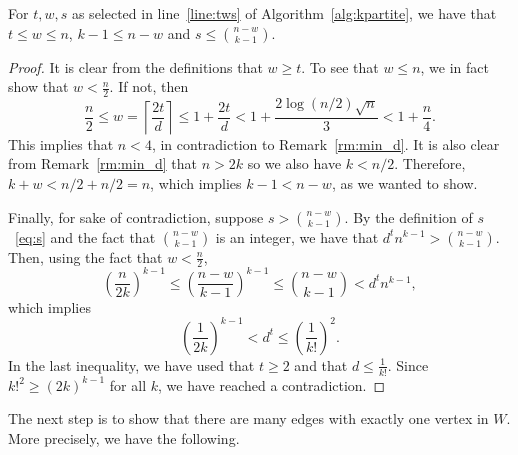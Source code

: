 \begin{lemma}\label{lm:sound}
    For $t, w, s$ as selected in line~\ref{line:tws} of Algorithm~\ref{alg:kpartite},
    we have that
    $t  \leq w \leq n$, $k - 1 \leq n - w$ and $s \leq \binom{n - w}{k - 1}$.
    \begin{proof}
        It is clear from the definitions that $w \geq t$.
        To see that $w \leq n$, we in fact show that $w < \frac{n}{2}$.
        If not, then
        \[
            \frac{n}{2} \leq
            w =
            \left\lceil \frac{2t}{d} \right\rceil \leq
            1 + \frac{2t}{d} <
            1 + \frac{2 \log (n/2) \sqrt{n}}{3} < %
            1 + \frac{n}{4}.
        \]
        This implies that $n < 4$, in contradiction to Remark~\ref{rm:min_d}.
        It is also clear from Remark~\ref{rm:min_d} that $n > 2k$
        so we also have $k < n/2$.
        Therefore, $ k + w < n/2 + n/2 = n$, which implies $k - 1 < n - w$,
        as we wanted to show.

        Finally, for sake of contradiction,
        suppose $s > \binom{n - w}{k - 1}$.
        By the definition of $s$~\eqref{eq:s}
        and the fact that $\binom{n-w}{k-1}$ is an integer, we have that
        $d^t n^{k-1} > \binom{n - w}{k - 1}$.
        Then, using the fact that $w < \frac{n}{2}$,
        \[
            \left( \frac{n}{2k} \right)^{k-1} \leq
            \left( \frac{n-w}{k-1} \right)^{k-1} \leq
            \binom{n - w}{k - 1} < d^t n^{k-1},
        \]
        which implies
        \[
            \left( \frac{1}{2k} \right)^{k-1} < d^t \leq
            \left( \frac{1}{k!} \right)^2.
        \]
        In the last inequality, we have used that $t \geq 2$ and that $d \leq \frac{1}{k!}$.
        Since $k!^2 \geq (2k)^{k-1}$ for all $k$,
        we have reached a contradiction. \qedhere

    \end{proof}
\end{lemma}

The next step is to show that there are many edges with exactly one vertex in $W$.
More precisely, we have the following.

